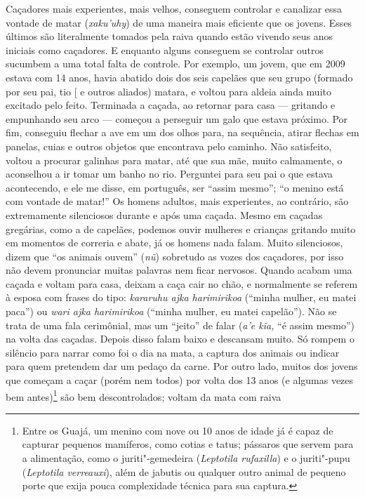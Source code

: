 Caçadores mais experientes, mais velhos, conseguem controlar e canalizar
essa vontade de matar (\emph{xaku'uhy}) de uma maneira mais eficiente
que os jovens. Esses últimos são literalmente tomados pela raiva quando
estão vivendo seus anos iniciais como caçadores. E enquanto alguns
conseguem se controlar outros sucumbem a uma total falta de controle.
Por exemplo, um jovem, que em 2009 estava com 14 anos, havia abatido
dois dos seis capelães que seu grupo (formado por seu pai, tio {[}\versal{FB}{]}
e outros aliados) matara, e voltou para aldeia ainda muito excitado pelo
feito. Terminada a caçada, ao retornar para casa --- gritando e empunhando
seu arco --- começou a perseguir um galo que estava próximo. Por fim,
conseguiu flechar a ave em um dos olhos para, na sequência, atirar
flechas em panelas, cuias e outros objetos que encontrava pelo caminho.
Não satisfeito, voltou a procurar galinhas para matar, até que sua mãe,
muito calmamente, o aconselhou a ir tomar um banho no rio. Perguntei
para seu pai o que estava acontecendo, e ele me disse, em português, ser
``assim mesmo''; ``o menino está com vontade de matar!'' Os homens adultos,
mais experientes, ao contrário, são extremamente silenciosos durante e
após uma caçada. Mesmo em caçadas gregárias, como a de capelães, podemos
ouvir mulheres e crianças gritando muito em momentos de correria e
abate, já os homens nada falam. Muito silenciosos, dizem que ``os animais
ouvem'' (\emph{nũ}) sobretudo as vozes dos caçadores, por isso não devem
pronunciar muitas palavras nem ficar nervosos. Quando acabam uma caçada
e voltam para casa, deixam a caça cair no chão, e normalmente se referem
à esposa com frases do tipo: \emph{kararuhu ajka harimirikoa} (``minha
mulher, eu matei paca'') ou \emph{wari ajka harimirikoa} (``minha
mulher, eu matei capelão''). Não se trata de uma fala cerimônial, mas um
``jeito'' de falar (\emph{a'e kĩa,} ``é assim mesmo'') na volta das
caçadas. Depois disso falam baixo e descansam muito. Só rompem o
silêncio para narrar como foi o dia na mata, a captura dos animais ou
indicar para quem pretendem dar um pedaço da carne. Por outro lado,
muitos dos jovens que começam a caçar (porém nem todos) por volta dos 13
anos (e algumas vezes bem antes)\footnote{Entre os Guajá, um menino com
  nove ou 10 anos de idade já é capaz de capturar pequenos mamíferos,
  como cotias e tatus; pássaros que servem para a alimentação, como o
  juriti"-gemedeira (\emph{Leptotila rufaxilla}) e o juriti"-pupu
  (\emph{Leptotila verreauxi}), além de jabutis ou qualquer outro animal
  de pequeno porte que exija pouca complexidade técnica para sua
  captura.} são bem descontrolados; voltam da mata com raiva
